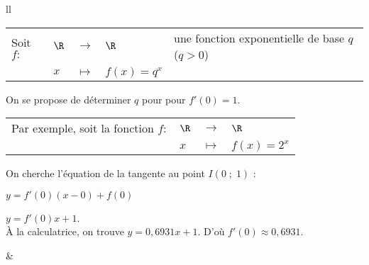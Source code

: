 \begin{tabular}{ll}
\hspace*{-.3cm} \begin{minipage}{10cm}
\begin{tabular}{lllll}
\hspace*{-.3cm} Soit $f:$ & $\R$ & $\longrightarrow$ & $\R$ & \hspace*{-1.4cm} une fonction exponentielle de base $q$ ($q > 0$) \\
& $x$ & $\longmapsto$ & $f(x) = q^x$ \\
\end{tabular}

\vspace*{.3cm}

On se propose de déterminer $q$ pour pour $f'(0) = 1$. \\

\begin{tabular}{llll}
\hspace*{-.3cm} Par exemple, soit la fonction $f:$ & $\R$ & $\longrightarrow$ & $\R$ \\
& $x$ & $\longmapsto$ & $f(x) = 2^x$ \\
\end{tabular}

\vspace*{.3cm}

On cherche l'équation de la tangente au point $I\left(0 \; ; \; 1\right)$ : 

$y = f'(0)\left(x-0\right) + f(0)$ 

$y = f'(0)x + 1$. \\

À la calculatrice, on trouve $y = 0,6931x + 1$. D'où $f'(0) \approx 0,6931$. \\
\end{minipage}
&
\begin{minipage}{5cm}
\vspace*{-5cm}
\hspace*{-4cm}
\end{minipage}
\end{tabular}
